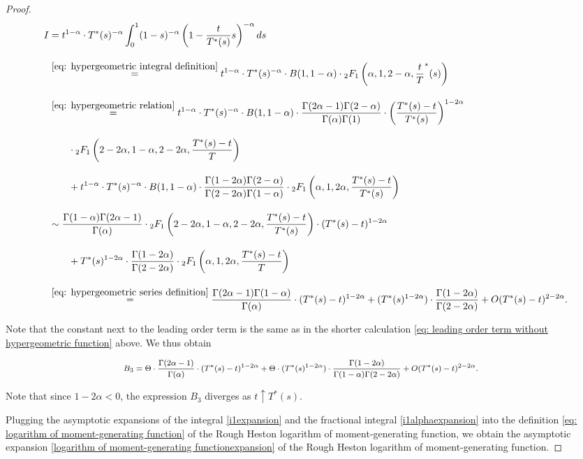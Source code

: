 \documentclass[12pt,twoside]{article}
\theoremstyle{plain}
\theoremstyle{plain}
\theoremstyle{definition}
\theoremstyle{remark}
\numberwithin{equation}{section}
\begin{document}
\begin{proof}
$$
\begin{aligned}
I &= t^{1-\alpha} \cdot T^*(s)^{-\alpha} \int_0^1 (1-s)^{-\alpha} \left(1-\frac {t}{T^*(s)} s\right)^{-\alpha} ds \\[10pt]
&\overset{\eqref{eq: hypergeometric integral definition}}{=} t^{1-\alpha} \cdot T^*(s)^{-\alpha} \cdot B(1, 1-\alpha) \cdot{_2 F_1}\left(\alpha, 1, 2-\alpha, \frac tT^*(s)\right) \\[10pt]
&\overset{\eqref{eq: hypergeometric relation}}{=} t^{1-\alpha} \cdot T^*(s)^{-\alpha} \cdot B(1,1-\alpha) \cdot \frac{\Gamma(2\alpha - 1) \Gamma (2-\alpha)}{\Gamma(\alpha) \Gamma(1)} \cdot \left(\frac{T^*(s)-t}{T^*(s)}\right)^{1-2\alpha} \\[10pt]
&\qquad \cdot {_2 F_1}\left(2-2\alpha, 1-\alpha, 2-2\alpha, \frac{T^*(s)-t}{T} \right) \\[10pt]
& \qquad + t^{1-\alpha} \cdot T^*(s)^{-\alpha} \cdot B(1,1-\alpha) \cdot \frac{\Gamma(1-2\alpha) \Gamma(2-\alpha)}{\Gamma(2-2\alpha)\Gamma(1-\alpha)}\cdot {_2F_1} \left(\alpha, 1, 2\alpha, \frac{T^*(s)-t}{T^*(s)}\right) \\[10pt]
&\sim \frac{\Gamma(1-\alpha)\Gamma(2\alpha-1)}{\Gamma(\alpha)} \cdot {_2 F_1}\left(2-2\alpha, 1-\alpha, 2-2\alpha, \frac{T^*(s)-t}{T^*(s)} \right) \cdot (T^*(s)-t)^{1-2\alpha}\\[10pt]
&\qquad + T^*(s)^{1-2\alpha} \cdot \frac{\Gamma(1-2\alpha)}{\Gamma(2-2\alpha)} \cdot {_2F_1} \left(\alpha, 1, 2\alpha, \frac{T^*(s)-t}{T}\right) \\[10pt]
&\overset{\eqref{eq: hypergeometric series definition}}{=} \frac{\Gamma(2\alpha-1)\Gamma(1-\alpha)}{\Gamma(\alpha)} \cdot (T^*(s)-t)^{1-2\alpha} + (T^*(s)^{1-2\alpha}) \cdot \frac{\Gamma(1-2\alpha)}{\Gamma(2-2\alpha) } + O(T^*(s)-t)^{2-2\alpha}.
\end{aligned}
$$

Note that the constant next to the leading order term is the same as in the shorter calculation \eqref{eq: leading order term without hypergeometric function} above. We thus obtain

\begin{equation}
\footnotesize
\begin{aligned}
B_3 &= \Theta \cdot \frac{ \Gamma(2\alpha - 1)}{\Gamma(\alpha)} \cdot (T^*(s)-t)^{1-2\alpha} +\Theta \cdot(T^*(s) ^{1-2\alpha}) \cdot \frac{\Gamma(1-2\alpha)}{\Gamma(1-\alpha)\Gamma(2-2\alpha)} + O(T^*(s)-t)^{2-2\alpha}.
\end{aligned}
\end{equation}

Note that since $1-2\alpha < 0$, the expression $B_3$ diverges as $t\uparrow T^*(s)$.

Plugging the asymptotic expansions of the integral \eqref{i1expansion} and the fractional integral \eqref{i1alphaexpansion} into the definition \eqref{eq: logarithm of moment-generating function} of the Rough Heston logarithm of moment-generating function, we obtain the asymptotic expansion \eqref{logarithm of moment-generating functionexpansion} of the Rough Heston logarithm of moment-generating function.

\end{proof}
\end{document}
